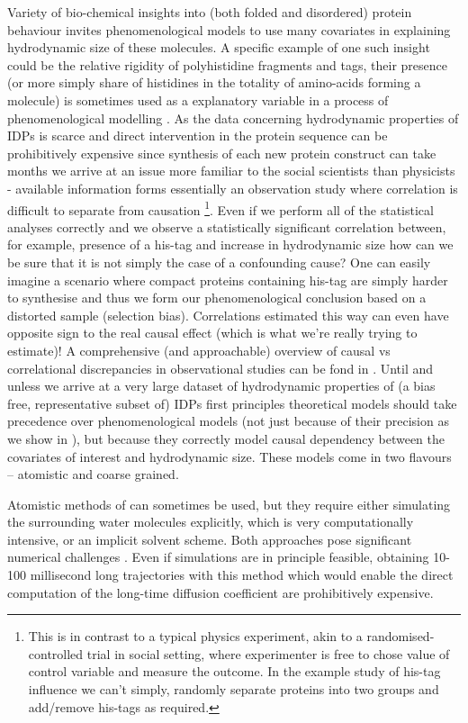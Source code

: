 \documentclass{doctoral}
\begin{document}
Variety of bio-chemical insights into (both folded and disordered) protein behaviour invites phenomenological models to use many covariates in explaining hydrodynamic size of these molecules.
A specific example of one such insight could be the relative rigidity of polyhistidine fragments and tags, their presence (or more simply share of histidines in the totality of amino-acids forming a molecule) is sometimes used as a explanatory variable in a process of phenomenological modelling \cite{Tomasso_2016,Marsh_2010}.
As the data concerning hydrodynamic properties of IDPs is scarce and direct intervention in the protein sequence can be prohibitively expensive since synthesis of each new protein construct can take months we arrive at an issue more familiar to the social scientists than physicists - available information forms essentially an observation study where correlation is difficult to separate from causation \footnote{ This is in contrast to a typical physics experiment, akin to a randomised-controlled trial in social setting, where experimenter is free to chose value of control variable and measure the outcome.
    In the example study of his-tag influence we can't simply, randomly separate proteins into two groups and add/remove his-tags as required.
}.
Even if we perform all of the statistical analyses correctly and we observe a statistically significant correlation between, for example, presence of a his-tag and increase in hydrodynamic size how can we be sure that it is not simply the case of a confounding cause?
One can easily imagine a scenario where compact proteins containing his-tag are simply harder to synthesise and thus we form our phenomenological conclusion based on a distorted sample (selection bias).
Correlations estimated this way can even have opposite sign to the real causal effect (which is what we're really trying to estimate)!
A comprehensive (and approachable) overview of causal vs correlational discrepancies in observational studies can be fond in \textcite{Cinelli_2022}.
Until and unless we arrive at a very large dataset of hydrodynamic properties of (a bias free, representative subset of) IDPs first principles theoretical models should take precedence over phenomenological models (not just because of their precision as we show in \textcite{Waszkiewicz_2024_mda}), but because they correctly model causal dependency between the covariates of interest and hydrodynamic size.
These models come in two flavours -- atomistic and coarse grained.

Atomistic methods of can sometimes be used\cite{Karplus_1990}, but they require either simulating the surrounding water molecules explicitly, which is very computationally intensive, or an implicit solvent scheme.
Both approaches pose significant numerical challenges \cite{Frenkel_2001}.
Even if simulations are in principle feasible, obtaining 10-100 millisecond long trajectories with this method which would enable the direct computation of the long-time diffusion coefficient are prohibitively expensive.
\end{document}
